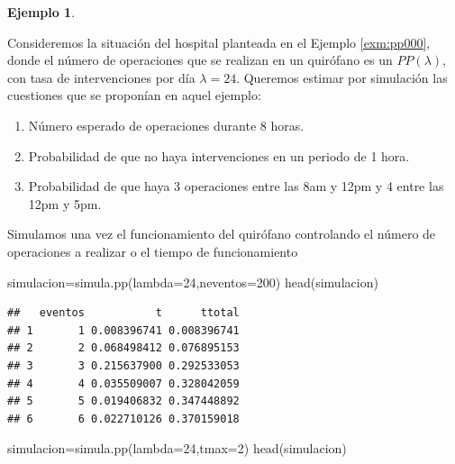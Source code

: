 \documentclass[
]{book}
\newenvironment{Shaded}{\begin{snugshade}}{\end{snugshade}}
\newcommand{\AttributeTok}[1]{\textcolor[rgb]{0.77,0.63,0.00}{#1}}
\newcommand{\DecValTok}[1]{\textcolor[rgb]{0.00,0.00,0.81}{#1}}
\newcommand{\FunctionTok}[1]{\textcolor[rgb]{0.00,0.00,0.00}{#1}}
\newcommand{\NormalTok}[1]{#1}
\newcommand{\OtherTok}[1]{\textcolor[rgb]{0.56,0.35,0.01}{#1}}
\providecommand{\tightlist}{%
  \setlength{\itemsep}{0pt}\setlength{\parskip}{0pt}}
\theoremstyle{definition}
\theoremstyle{definition}
\newtheorem{example}{Ejemplo}[chapter]
\theoremstyle{definition}
\theoremstyle{definition}
\theoremstyle{remark}
\begin{document}
\begin{example}
\protect\hypertarget{exm:pp006}{}\label{exm:pp006}

Consideremos la situación del hospital planteada en el Ejemplo \ref{exm:pp000}, donde el número de operaciones que se realizan en un quirófano es un \(PP(\lambda)\), con tasa de intervenciones por día \(\lambda=24\). Queremos estimar por simulación las cuestiones que se proponían en aquel ejemplo:

\begin{enumerate}
\def\labelenumi{\arabic{enumi}.}
\tightlist
\item
  Número esperado de operaciones durante 8 horas.
\item
  Probabilidad de que no haya intervenciones en un periodo de 1 hora.
\item
  Probabilidad de que haya 3 operaciones entre las 8am y 12pm y 4 entre las 12pm y 5pm.
\end{enumerate}

\end{example}

Simulamos una vez el funcionamiento del quirófano controlando el número de operaciones a realizar o el tiempo de funcionamiento

\begin{Shaded}
\begin{Highlighting}[]
\NormalTok{simulacion}\OtherTok{=}\FunctionTok{simula.pp}\NormalTok{(}\AttributeTok{lambda=}\DecValTok{24}\NormalTok{,}\AttributeTok{neventos=}\DecValTok{200}\NormalTok{)}
\FunctionTok{head}\NormalTok{(simulacion)}
\end{Highlighting}
\end{Shaded}

\begin{verbatim}
##   eventos           t      ttotal
## 1       1 0.008396741 0.008396741
## 2       2 0.068498412 0.076895153
## 3       3 0.215637900 0.292533053
## 4       4 0.035509007 0.328042059
## 5       5 0.019406832 0.347448892
## 6       6 0.022710126 0.370159018
\end{verbatim}

\begin{Shaded}
\begin{Highlighting}[]
\NormalTok{simulacion}\OtherTok{=}\FunctionTok{simula.pp}\NormalTok{(}\AttributeTok{lambda=}\DecValTok{24}\NormalTok{,}\AttributeTok{tmax=}\DecValTok{2}\NormalTok{)}
\FunctionTok{head}\NormalTok{(simulacion)}
\end{Highlighting}
\end{Shaded}
\end{document}
